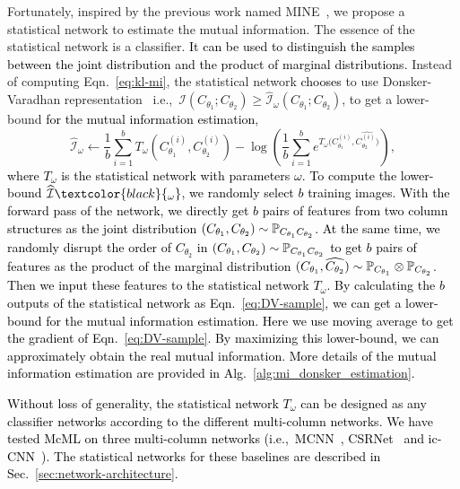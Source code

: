 \documentclass[sigconf]{acmart}
\newcommand{\ljx}[1]{\textcolor{black}{#1}}
\newcommand{\czq}[1]{\textcolor{black}{#1}}
\newcommand{\beq}{\begin{equation}}
\newcommand{\eeq}{\end{equation}}
\newcommand{\II}{\mathcal{I}}
\newcommand{\PJ}[2]{\mathbb{P}_{#1#2}}  %
\newcommand{\PI}[2]{\mathbb{P}_{#1}\otimes\mathbb{P}_{#2}}  %
\newcommand\Eq{Eqn.}
\newcommand\Sec{Sec.}
\newcommand\Alg{Alg.}
\begin{document}
Fortunately, inspired by the previous work named MINE~\cite{Mime}, we propose a statistical network to estimate the mutual information.
The essence of the statistical network is a classifier.
\czq{It can be used to distinguish the samples between the joint distribution and the product of marginal distributions.}
Instead of computing \Eq~\ref{eq:kl-mi}, the statistical network \czq{chooses} to use Donsker-Varadhan representation~\cite{DV-83} i.e.,~$\II(C_{\theta_1}; C_{\theta_2}) \geq \widehat{\II}_{\omega}(C_{\theta_1}; C_{\theta_2})$, to get a lower-bound \czq{for the mutual information estimation},
\beq 
\label{eq:DV-sample}
\widehat{\II}_\omega \gets \frac{1}{b} \sum_{i=1}^{b} T_\omega (C_{\theta_1}^{(i)},C_{\theta_2}^{(i)}) - \log(\frac{1}{b} \sum_{i=1}^{b} e^{T_\omega(C_{\theta_1}^{(i)},\widehat{C_{\theta_2}^{(i)})}}),
\eeq
\czq{where $T_\omega$ is the statistical network with parameters $\omega$.
To compute the lower-bound $\widehat{\II}\ljx{_\omega}$, we randomly select $b$ training images. 
With the forward pass of the network, we directly get $b$ pairs of features from two column structures as the joint distribution $\small{(C_{\theta_1}, C_{\theta_2}) \sim \PJ{C_{\theta_1}}{C_{\theta_2}}}$.
At the same time, we randomly disrupt the order of $C_{\theta_2}$ in $\small{(C_{\theta_1}, C_{\theta_2}) \sim \PJ{C_{\theta_1}}{C_{\theta_2}}}$
to get $b$ pairs of features as the product of the marginal distribution $\small{(C_{\theta_1}, \widehat{C_{\theta_2}})\sim \PI{C_{\theta_1}}{C_{\theta_2}}}$.
Then we input these features to the statistical network $T_\omega$.
By calculating the $b$ outputs of the statistical network as \Eq~\ref{eq:DV-sample}, we can get a lower-bound for the mutual information estimation.
Here we use moving average to get the gradient of \Eq~\ref{eq:DV-sample}.
By maximizing this lower-bound, we can approximately obtain the real mutual information.
More details of the mutual information estimation are provided in \Alg~\ref{alg:mi_donsker_estimation}.}


\czq{Without loss of generality, the statistical network $T_\omega$ can be designed as any classifier networks according to the different multi-column networks.
We have tested McML on three multi-column networks (i.e.,~MCNN~\cite{MCNN-16}, CSRNet~\cite{CSRNet-18} and ic-CNN~\cite{deep-training-ICCNN-18}). 
The statistical networks for these baselines are described in \Sec~\ref{sec:network-architecture}.}
\end{document}
